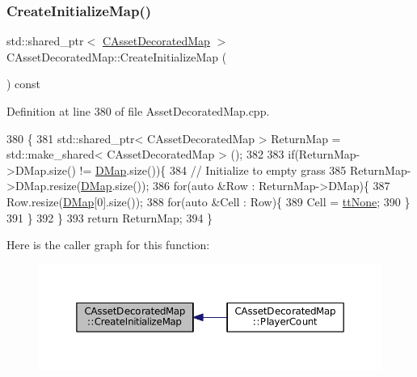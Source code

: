 \hypertarget{classCAssetDecoratedMap_a2807be3f5fe7858f476b80fef228fa03}{}\label{classCAssetDecoratedMap_a2807be3f5fe7858f476b80fef228fa03} 
\subsubsection{\texorpdfstring{Create\+Initialize\+Map()}{CreateInitializeMap()}}
{\footnotesize\ttfamily std\+::shared\+\_\+ptr$<$ \hyperlink{classCAssetDecoratedMap}{C\+Asset\+Decorated\+Map} $>$ C\+Asset\+Decorated\+Map\+::\+Create\+Initialize\+Map (\begin{DoxyParamCaption}{ }\end{DoxyParamCaption}) const}



Definition at line 380 of file Asset\+Decorated\+Map.\+cpp.


\begin{DoxyCode}
380                                                                                  \{
381     std::shared\_ptr< CAssetDecoratedMap > ReturnMap = std::make\_shared< CAssetDecoratedMap > ();
382     
383     \textcolor{keywordflow}{if}(ReturnMap->DMap.size() != \hyperlink{classCTerrainMap_a80d154ce478948b10473534a7bca13f6}{DMap}.size())\{
384         \textcolor{comment}{// Initialize to empty grass}
385         ReturnMap->DMap.resize(\hyperlink{classCTerrainMap_a80d154ce478948b10473534a7bca13f6}{DMap}.size());
386         \textcolor{keywordflow}{for}(\textcolor{keyword}{auto} &Row : ReturnMap->DMap)\{
387             Row.resize(\hyperlink{classCTerrainMap_a80d154ce478948b10473534a7bca13f6}{DMap}[0].size());
388             \textcolor{keywordflow}{for}(\textcolor{keyword}{auto} &Cell : Row)\{
389                 Cell = \hyperlink{classCTerrainMap_aff2ab991e237269941416dd79d8871d4a481e779132fb16414d17870bd6229eb5}{ttNone};
390             \}
391         \}
392     \}
393     \textcolor{keywordflow}{return} ReturnMap;
394 \}
\end{DoxyCode}
Here is the caller graph for this function\+:
\nopagebreak
\begin{figure}[H]
\begin{center}
\leavevmode
\includegraphics[width=350pt]{classCAssetDecoratedMap_a2807be3f5fe7858f476b80fef228fa03_icgraph}
\end{center}
\end{figure}
\hypertarget{classCAssetDecoratedMap_aa05e81ec37b4217053e8de050e47dba7}{}\label{classCAssetDecoratedMap_aa05e81ec37b4217053e8de050e47dba7} 
